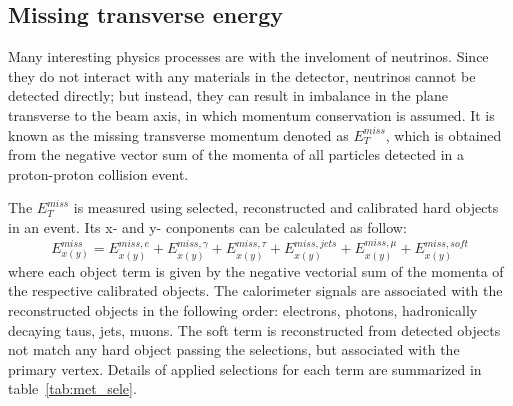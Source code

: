\subsection{Missing transverse energy}

Many interesting physics processes are with the inveloment of neutrinos.
Since they do not interact with any materials in the detector, neutrinos cannot be detected directly;
but instead, they can result in imbalance in the plane transverse to the beam axis, in which momentum conservation is assumed.
It is known as the missing transverse momentum denoted as $E_{T}^{miss}$,
which is obtained from the negative vector sum of the momenta of all particles detected in a proton-proton collision event.

The $E_{T}^{miss}$ is measured using selected, reconstructed and calibrated hard objects in an event.
Its x- and y- conponents can be calculated as follow\cite{Aaboud2018}:
\begin{equation} \label{eq:met_xy}
	E_{x(y)}^{miss} = E_{x(y)}^{miss, e} + E_{x(y)}^{miss, \gamma} + E_{x(y)}^{miss, \tau} + E_{x(y)}^{miss, jets} + E_{x(y)}^{miss, \mu} + E_{x(y)}^{miss, soft}
\end{equation}
where each object term is given by the negative vectorial sum of the momenta of the respective calibrated objects.
The calorimeter signals are associated with the reconstructed objects in the following order: electrons, photons, hadronically decaying taus, jets, muons.
The soft term is reconstructed from detected objects not match any hard object passing the selections, but associated with the primary vertex.
Details of applied selections for each term are summarized in table~\ref{tab:met_sele}.
